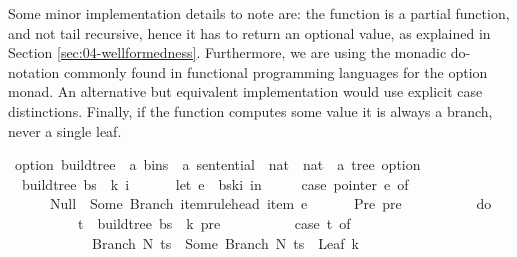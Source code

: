 \begin{isabellebody}
\begin{isamarkuptext}
Some minor implementation details to note are: the function  is a partial function,
and not tail recursive, hence it has to return an optional value, as explained in Section \ref{sec:04-wellformedness}.
Furthermore, we are using the monadic do-notation commonly found in functional programming languages for the option
monad. An alternative but equivalent implementation would use explicit case distinctions. Finally, if
the function computes some value it is always a branch, never a single leaf.%
\end{isamarkuptext}\isamarkuptrue%
\isamarkupfalse%
\ {\isacharparenleft}{\kern0pt}option{\isacharparenright}{\kern0pt}\ build{\isacharunderscore}{\kern0pt}tree{\isacharprime}{\kern0pt}\ {\isacharcolon}{\kern0pt}{\isacharcolon}{\kern0pt}\ {\isachardoublequoteopen}{\isacharprime}{\kern0pt}a\ bins\ {\isasymRightarrow}\ {\isacharprime}{\kern0pt}a\ sentential\ {\isasymRightarrow}\ nat\ {\isasymRightarrow}\ nat\ {\isasymRightarrow}\ {\isacharprime}{\kern0pt}a\ tree\ option{\isachardoublequoteclose}\ \isanewline
\ \ {\isachardoublequoteopen}build{\isacharunderscore}{\kern0pt}tree{\isacharprime}{\kern0pt}\ bs\ {\isasymomega}\ k\ i\ {\isacharequal}{\kern0pt}\ {\isacharparenleft}{\kern0pt}\isanewline
\ \ \ \ let\ e\ {\isacharequal}{\kern0pt}\ bs{\isacharbang}{\kern0pt}k{\isacharbang}{\kern0pt}i\ in\ {\isacharparenleft}{\kern0pt}\isanewline
\ \ \ \ case\ pointer\ e\ of\isanewline
\ \ \ \ \ \ Null\ {\isasymRightarrow}\ Some\ {\isacharparenleft}{\kern0pt}Branch\ {\isacharparenleft}{\kern0pt}item{\isacharunderscore}{\kern0pt}rule{\isacharunderscore}{\kern0pt}head\ {\isacharparenleft}{\kern0pt}item\ e{\isacharparenright}{\kern0pt}{\isacharparenright}{\kern0pt}\ {\isacharbrackleft}{\kern0pt}{\isacharbrackright}{\kern0pt}{\isacharparenright}{\kern0pt}\isanewline
\ \ \ \ {\isacharbar}{\kern0pt}\ Pre\ pre\ {\isasymRightarrow}\ {\isacharparenleft}{\kern0pt}\isanewline
\ \ \ \ \ \ \ \ do\ {\isacharbraceleft}{\kern0pt}\isanewline
\ \ \ \ \ \ \ \ \ \ t\ {\isasymleftarrow}\ build{\isacharunderscore}{\kern0pt}tree{\isacharprime}{\kern0pt}\ bs\ {\isasymomega}\ {\isacharparenleft}{\kern0pt}k{\isacharminus}{\kern0pt}{}{\isacharparenright}{\kern0pt}\ pre{\isacharsemicolon}{\kern0pt}\isanewline
\ \ \ \ \ \ \ \ \ \ case\ t\ of\isanewline
\ \ \ \ \ \ \ \ \ \ \ \ Branch\ N\ ts\ {\isasymRightarrow}\ Some\ {\isacharparenleft}{\kern0pt}Branch\ N\ {\isacharparenleft}{\kern0pt}ts\ {\isacharat}{\kern0pt}\ {\isacharbrackleft}{\kern0pt}Leaf\ {\isacharparenleft}{\kern0pt}{\isasymomega}{\isacharbang}{\kern0pt}{\isacharparenleft}{\kern0pt}k{\isacharminus}{\kern0pt}{}{\isacharparenright}{\kern0pt}{\isacharparenright}{\kern0pt}{\isacharbrackright}{\kern0pt}{\isacharparenright}{\kern0pt}{\isacharparenright}{\kern0pt}\isanewline

\end{isabellebody}
